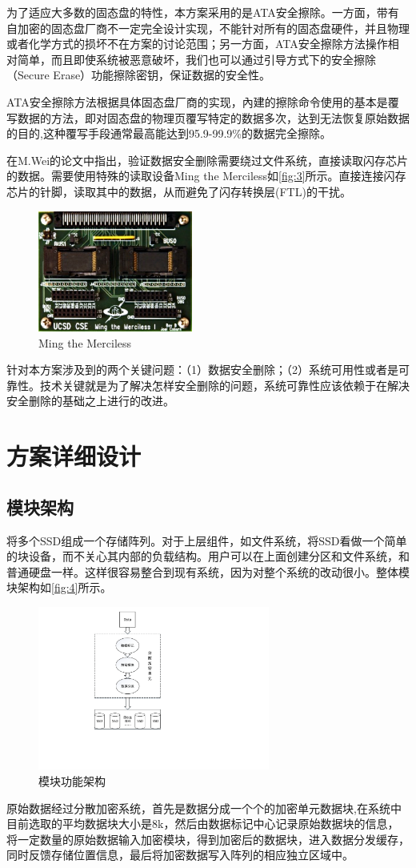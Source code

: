 为了适应大多数的固态盘的特性，本方案采用的是ATA安全擦除。一方面，带有自加密的固态盘厂商不一定完全设计实现，不能针对所有的固态盘硬件，并且物理或者化学方式的损坏不在方案的讨论范围；另一方面，ATA安全擦除方法操作相对简单，而且即使系统被恶意破坏，我们也可以通过引导方式下的安全擦除（Secure Erase）功能擦除密钥，保证数据的安全性。


ATA安全擦除方法根据具体固态盘厂商的实现，內建的擦除命令使用的基本是覆写数据的方法，即对固态盘的物理页覆写特定的数据多次，达到无法恢复原始数据的目的,这种覆写手段通常最高能达到95.9-99.9\%的数据完全擦除\cite{Wei2011Reliably}。


在M.Wei的论文\cite{Wei2011Reliably}中指出，验证数据安全删除需要绕过文件系统，直接读取闪存芯片的数据。需要使用特殊的读取设备Ming the Merciless如\autoref{fig:3}所示。直接连接闪存芯片的针脚，读取其中的数据，从而避免了闪存转换层(FTL)的干扰。
\begin{figure}[H]
	\centering
	\includegraphics[width=2in]{Pics/ming.png}
	\caption{Ming the Merciless}
    \label{fig:3}
\end{figure}
针对本方案涉及到的两个关键问题：（1）数据安全删除；（2）系统可用性或者是可靠性。技术关键就是为了解决怎样安全删除的问题，系统可靠性应该依赖于在解决安全删除的基础之上进行的改进。
\section{方案详细设计}
\subsection{模块架构}
将多个SSD组成一个存储阵列。对于上层组件，如文件系统，将SSD看做一个简单的块设备，而不关心其内部的负载结构。用户可以在上面创建分区和文件系统，和普通硬盘一样。这样很容易整合到现有系统，因为对整个系统的改动很小。整体模块架构如\autoref{fig:4}所示。
\begin{figure}[H]
	\centering
	\includegraphics[width=3in]{Pics/total-structure.pdf}
    \caption{模块功能架构}
    \label{fig:4}
\end{figure}
原始数据经过分散加密系统，首先是数据分成一个个的加密单元数据块,在系统中目前选取的平均数据块大小是8k，然后由数据标记中心记录原始数据块的信息，将一定数量的原始数据输入加密模块，得到加密后的数据块，进入数据分发缓存，同时反馈存储位置信息，最后将加密数据写入阵列的相应独立区域中。
